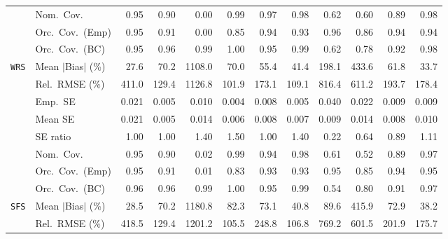 \begin{landscape}
\begin{longtable}{llrrrrrrrrrr}
 & Nom.\ Cov. & \cellcolor{rankone}0.95 & 0.90 & 0.00 & 0.99 & \cellcolor{ranktwo}0.97 & \cellcolor{rankthree}0.98 & 0.62 & 0.60 & 0.89 & \cellcolor{rankthree}0.98 \\
 & Orc.\ Cov.\ (Emp) & \cellcolor{rankone}0.95 & 0.91 & 0.00 & 0.85 & \cellcolor{ranktwo}0.94 & \cellcolor{rankthree}0.93 & \cellcolor{ranktwo}0.96 & 0.86 & \cellcolor{ranktwo}0.94 & \cellcolor{ranktwo}0.94 \\
 & Orc.\ Cov.\ (BC) & \cellcolor{rankone}0.95 & \cellcolor{ranktwo}0.96 & 0.99 & 1.00 & \cellcolor{rankone}0.95 & 0.99 & 0.62 & 0.78 & \cellcolor{rankthree}0.92 & \cellcolor{rankthree}0.98 \\
\addlinespace[2pt]
\quad \texttt{WRS} & Mean $|$Bias$|$ (\%) & \cellcolor{rankone}27.6 & 70.2 & 1108.0 & 70.0 & 55.4 & \cellcolor{rankthree}41.4 & 198.1 & 433.6 & 61.8 & \cellcolor{ranktwo}33.7 \\
 & Rel.\ RMSE (\%) & 411.0 & \cellcolor{rankthree}129.4 & 1126.8 & \cellcolor{rankone}101.9 & 173.1 & \cellcolor{ranktwo}109.1 & 816.4 & 611.2 & 193.7 & 178.4 \\
 & Emp.\ SE & 0.021 & 0.005 & 0.010 & 0.004 & 0.008 & 0.005 & 0.040 & 0.022 & 0.009 & 0.009 \\
 & Mean SE & 0.021 & 0.005 & 0.014 & 0.006 & 0.008 & 0.007 & 0.009 & 0.014 & 0.008 & 0.010 \\
 & SE ratio & \cellcolor{rankone}1.00 & \cellcolor{rankone}1.00 & 1.40 & 1.50 & \cellcolor{rankone}1.00 & 1.40 & 0.22 & \cellcolor{rankthree}0.64 & \cellcolor{ranktwo}0.89 & \cellcolor{ranktwo}1.11 \\
 & Nom.\ Cov. & \cellcolor{rankone}0.95 & 0.90 & 0.02 & 0.99 & \cellcolor{ranktwo}0.94 & 0.98 & 0.61 & 0.52 & 0.89 & \cellcolor{rankthree}0.97 \\
 & Orc.\ Cov.\ (Emp) & \cellcolor{rankone}0.95 & 0.91 & 0.01 & 0.83 & \cellcolor{rankthree}0.93 & \cellcolor{rankthree}0.93 & \cellcolor{rankone}0.95 & 0.85 & \cellcolor{ranktwo}0.94 & \cellcolor{rankone}0.95 \\
 & Orc.\ Cov.\ (BC) & \cellcolor{ranktwo}0.96 & \cellcolor{ranktwo}0.96 & 0.99 & 1.00 & \cellcolor{rankone}0.95 & 0.99 & 0.54 & 0.80 & 0.91 & \cellcolor{rankthree}0.97 \\
\addlinespace[2pt]
\quad \texttt{SFS} & Mean $|$Bias$|$ (\%) & \cellcolor{rankone}28.5 & 70.2 & 1180.8 & 82.3 & 73.1 & \cellcolor{rankthree}40.8 & 89.6 & 415.9 & 72.9 & \cellcolor{ranktwo}38.2 \\
 & Rel.\ RMSE (\%) & 418.5 & \cellcolor{rankthree}129.4 & 1201.2 & \cellcolor{rankone}105.5 & 248.8 & \cellcolor{ranktwo}106.8 & 769.2 & 601.5 & 201.9 & 175.7 \\

\end{longtable}
\end{landscape}
